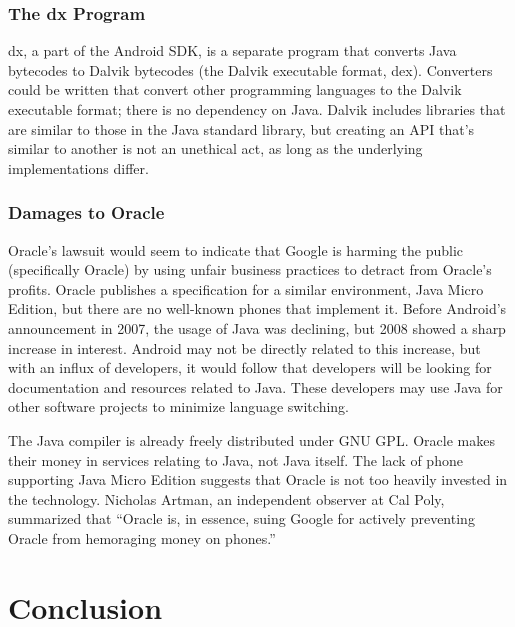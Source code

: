 \documentclass[11pt]{article}
\begin{document}
\begin{multicols}{2}
\subsubsection{The dx Program} %
\label{ssub:dex}

dx, a part of the Android SDK, is a separate program that converts Java
bytecodes to Dalvik bytecodes (the Dalvik executable format, dex).  Converters
could be written that convert other programming languages to the Dalvik
executable format; there is no dependency on Java.  Dalvik includes libraries
that are similar to those in the Java standard library, but creating an API
that's similar to another is not an unethical act, as long as the underlying
implementations differ.


\subsubsection{Damages to Oracle} %
\label{ssub:oracle-damage}

Oracle's lawsuit would seem to indicate that Google is harming the public
(specifically Oracle) by using unfair business practices to detract from
Oracle's profits.  Oracle publishes a specification for a similar environment,
Java Micro Edition, but there are no well-known phones that implement it.
Before Android's announcement in 2007, the usage of Java was declining, but 2008
showed a sharp increase in interest.  \cite{tiobe}  Android may not be directly
related to this increase, but with an influx of developers, it would follow that
developers will be looking for documentation and resources related to Java.
These developers may use Java for other software projects to minimize language
switching.

The Java compiler is already freely distributed under GNU GPL.  Oracle makes
their money in services relating to Java, not Java itself.  The lack of phone
supporting Java Micro Edition suggests that Oracle is not too heavily invested
in the technology.  Nicholas Artman, an independent observer at Cal Poly,
summarized that ``Oracle is, in essence, suing Google for actively preventing
Oracle from hemoraging money on phones.''




\section{Conclusion} %
\label{sec:conclusion}


\end{multicols}
\end{document}
